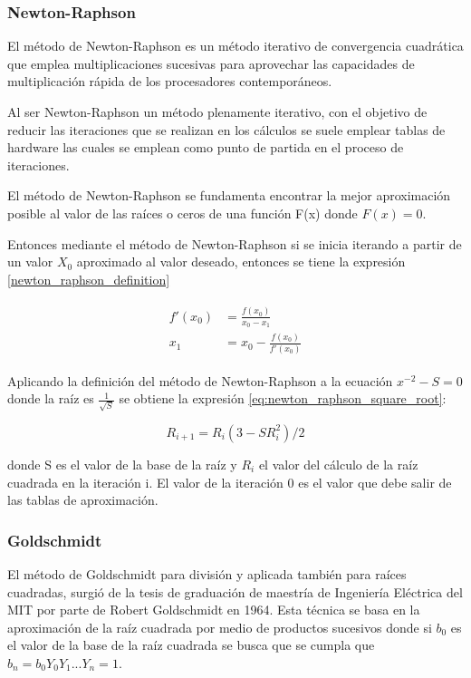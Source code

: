 \subsubsection{Newton-Raphson}

El método de Newton-Raphson es un método iterativo de convergencia cuadrática que emplea multiplicaciones sucesivas para aprovechar las capacidades de multiplicación rápida de los procesadores contemporáneos. 

Al ser Newton-Raphson un método plenamente iterativo, con el objetivo de reducir las iteraciones que se realizan en los cálculos se suele emplear tablas de hardware las cuales se emplean como punto de partida en el proceso de iteraciones.

El método de Newton-Raphson se fundamenta encontrar la mejor aproximación posible al valor de las raíces o ceros de una función F(x) donde $F(x)=0$. 

Entonces mediante el método de Newton-Raphson si se inicia iterando a partir de un valor $X_0$ aproximado al valor deseado, entonces se tiene la expresión \ref{newton_raphson_definition}


\begin{align} \label{newton_raphson_definition}
\begin{split}
  f'(x_0) &= \frac{f(x_0)}{x_0-x_1} 
\\
  x_1 &= x_0-\frac{f(x_0)}{f'(x_0)} 
\end{split}  
\end{align} 


Aplicando la definición del método de Newton-Raphson a la ecuación $x^{-2}-S=0$ donde la raíz es $\frac{1}{\sqrt{S}}$ se obtiene la expresión \eqref{eq:newton_raphson_square_root}:

\begin{equation}
\label{eq:newton_raphson_square_root}
  R_{i+1}=R_{i}(3-SR_{i}^{2})/2
\end{equation}

donde S es el valor de la base de la raíz y $R_{i}$ el valor del cálculo de la raíz cuadrada en la iteración i. El valor de la iteración 0 es el valor que debe salir de las tablas de aproximación.


\subsubsection{Goldschmidt}

El método de Goldschmidt para división y aplicada también para raíces cuadradas, surgió de la tesis de graduación de maestría de Ingeniería Eléctrica del MIT por parte de Robert Goldschmidt en 1964. Esta técnica se basa en la aproximación de la raíz cuadrada por medio de productos sucesivos donde si $b_{0}$ es el valor de la base de la raíz cuadrada se busca que se cumpla que $b_{n}=b_{0}Y_{0}Y_{1}...Y_{n}=1$.

